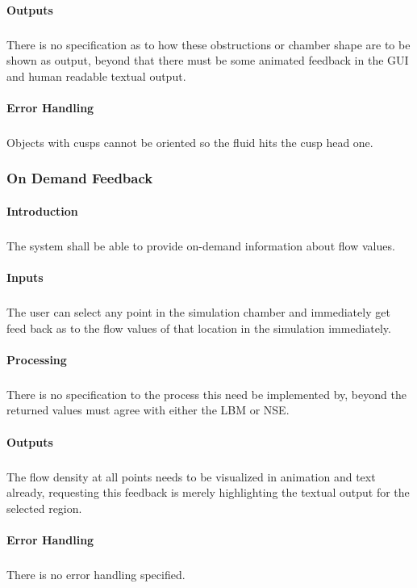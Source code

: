\documentclass{scrartcl}
\begin{document}
\paragraph{Outputs}
\subparagraph{}
There is no specification as to how these obstructions or chamber shape are to be shown as output, beyond that there must be some animated feedback in the GUI and human readable textual output.

\paragraph{Error Handling}
\subparagraph{}
Objects with cusps cannot be oriented so the fluid hits the cusp head one. 



\subsubsection{On Demand Feedback}
\paragraph{Introduction}
\subparagraph{}
The system shall be able to provide on-demand information about flow values.

\paragraph{Inputs}
\subparagraph{}
The user can select any point in the simulation chamber and immediately get feed back as to the flow values of that location in the simulation immediately. 

\paragraph{Processing}
\subparagraph{}
There is no specification to the process this need be implemented by, beyond the returned values must agree with either the LBM or NSE.

\paragraph{Outputs}
\subparagraph{}
The flow density at all points needs to be visualized in animation and text already, requesting this feedback is merely highlighting the textual output for the selected region.

\paragraph{Error Handling}
\subparagraph{}
There is no error handling specified.
\end{document}

